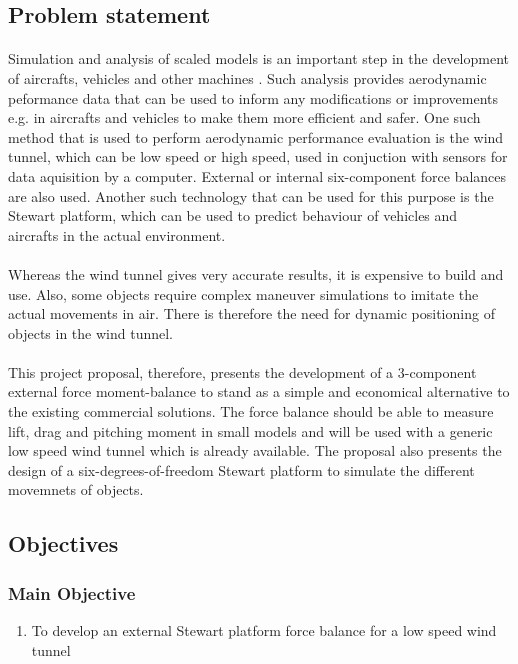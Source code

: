 \subsection{Problem statement}
\paragraph{}Simulation and analysis of scaled models is an important step in the development of aircrafts, vehicles and other machines . Such analysis provides aerodynamic peformance data that can be used to inform any modifications or improvements e.g. in aircrafts and vehicles to make them more efficient and safer. One such method that is used to perform aerodynamic performance evaluation is the wind tunnel, which can be low speed or high speed, used in conjuction with sensors for data aquisition by a computer. External or internal six-component force balances are also used. Another such technology that can be used for this purpose is the Stewart platform, which can be used to predict behaviour of vehicles and aircrafts in the actual environment.
\paragraph{}Whereas the wind tunnel gives very accurate results, it is expensive to build and use. Also, some objects require complex maneuver simulations to imitate the actual movements in air. There is therefore the need for dynamic positioning of objects in the wind tunnel.

\paragraph{}This project proposal, therefore, presents the development of a 3-component external force moment-balance to stand as a simple and economical alternative to the existing commercial solutions. The force balance should be able to measure lift, drag and pitching moment in small models and will be used with a generic low speed wind tunnel which is already available. The proposal also presents the design of a six-degrees-of-freedom Stewart platform to simulate the different movemnets of objects.
\subsection{Objectives}
\subsubsection{Main Objective}
\begin{enumerate}
\item To develop an external Stewart platform force balance for a low speed wind tunnel 
\end{enumerate}
